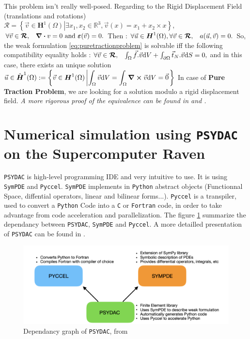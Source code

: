 \documentclass[a4paper,12pt,twoside]{report}
\newcommand{\mtr}{\mathbb{R}}
\newcommand{\dif}{\mathrm{d}}
\begin{document}
This problem isn't really well-posed. Regarding to the Rigid Displacement Field (translations and rotations) $\boldsymbol{\mathcal{R}} = \left\{\vec v \in \boldsymbol H^1(\Omega) \left| \exists x_1, x_2 \in \mtr^3, \vec v(x) = x_1 + x_2 \times x \right. \right\}$, $\forall \vec v \in \boldsymbol{\mathcal{R}}, \hspace{0.3cm} \div v = 0 \text{ and } \boldsymbol \varepsilon(\vec v) = 0.$
Then : $\forall \vec u \in \boldsymbol H^1(\Omega), \forall \vec v \in \boldsymbol{\mathcal{R}},\hspace{0.3cm} a(\vec u, \vec v)= 0.$
So, the weak formulation \eqref{eq:puretractionproblem} is solvable iff the following compatibility equality holds : $\forall \vec v \in \boldsymbol{\mathcal{R}}, \hspace{0.3cm}\int_\Omega \vec f . \vec v \dif V + \int_{\partial\Omega} \vec t_N.\vec v \dif S = 0,$
and in this case, there exists an unique solution $\vec u \in \hat{\boldsymbol H}^1(\Omega) := \left\{\vec v \in \boldsymbol H^1(\Omega) \left| \displaystyle \int_\Omega \vec v \dif V = \int_\Omega  \curl \vec v \dif V = \vec 0 \right. \right\}$ 
In case of \textbf{Pure Traction Problem}, we are looking for a solution modulo a rigid displacement field.
\textit{A more rigorous proof of the equivalence can be found in \cite{brenner_mathematical_2008} and \cite{chen_variational}.}


\section{Numerical simulation using \texttt{PSYDAC} on the Supercomputer Raven}

\texttt{PSYDAC} is high-level programming IDE and very intuitive to use. It is using \texttt{SymPDE} and \texttt{Pyccel}. \texttt{SymPDE} implements in \texttt{Python} abstract objects (Functionnal Space, diffential operators, linear and bilinear forms...). \texttt{Pyccel} is a transpiler, used to convert a \texttt{Python} Code into a \texttt{C} or \texttt{Fortran} code, in order to take advantage from code acceleration and parallelization. The figure \ref{fig:Dependancy_Psydac} summarize the dependancy between \texttt{PSYDAC}, \texttt{SymPDE} and \texttt{Pyccel}. A more detailled presentation of \texttt{PSYDAC} can be found in \cite{guclu_psydac_2022}.

\begin{figure}[!h]
    \centering
    \includegraphics[width=0.75\linewidth]{figures/psydac_fonc_1.png}
    \caption{Dependancy graph of \texttt{PSYDAC}, from \cite{guclu_psydac_2022}}
    \label{fig:Dependancy_Psydac}
\end{figure}
\end{document}
